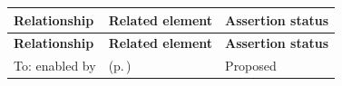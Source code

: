 \begingroup\small\setlength{\TableWidth}{\dimexpr\linewidth-6\tabcolsep-4\arrayrulewidth\relax}
\begin{longtable}{|>{\raggedright\arraybackslash}p{0.27\TableWidth}|>{\raggedright\arraybackslash}p{0.48\TableWidth}|>{\raggedright\arraybackslash}p{0.25\TableWidth}|}
\hline\rowcolor{TableHead}\textbf{Relationship} & \textbf{Related element} & \textbf{Assertion status}\\\hline\endfirsthead
\hline\rowcolor{TableHead}\textbf{Relationship} & \textbf{Related element} & \textbf{Assertion status}\\\hline\endhead
\hline\endfoot
To: enabled by & \nameref{cap:bec-information-lineage-stewardship} (p.\,\pageref{cap:bec-information-lineage-stewardship}) & Proposed\\\hline
\end{longtable}\endgroup

